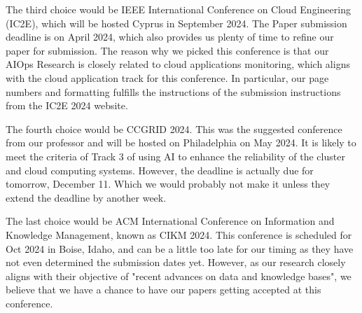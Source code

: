 \documentclass[conference]{IEEEtran}
\begin{document}
The third choice would be IEEE International Conference on Cloud Engineering (IC2E), which will be hosted Cyprus in September 2024. The Paper submission deadline is on April 2024, which also provides us plenty of time to refine our paper for submission. The reason why we picked this conference is that our AIOps Research is closely related to cloud applications monitoring, which aligns with the cloud application track for this conference. In particular, our page numbers and formatting fulfills the instructions of the submission instructions from the IC2E 2024 website.

The fourth choice would be CCGRID 2024. This was the suggested conference from our professor and will be hosted on Philadelphia on May 2024. It is likely to meet the criteria of Track 3 of using AI to enhance the reliability of the cluster and cloud computing systems. However, the deadline is actually due for tomorrow, December 11. Which we would probably not make it unless they extend the deadline by another week.

The last choice would be ACM International Conference on Information and Knowledge Management, known as CIKM 2024. This conference is scheduled for Oct 2024 in Boise, Idaho, and can be a little too late for our timing as they have not even determined the submission dates yet. However, as our research closely aligns with their objective of "recent advances on data and knowledge bases", we believe that we have a chance to have our papers getting accepted at this conference.



\clearpage


\vspace{12pt}
\end{document}
